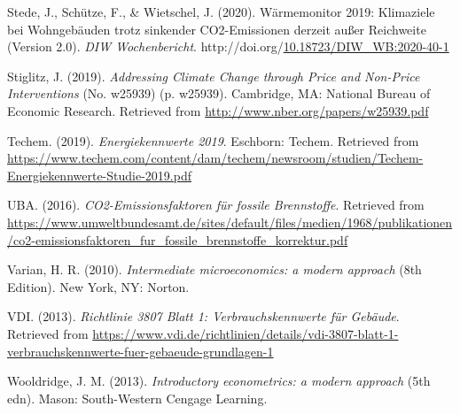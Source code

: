 \documentclass[12pt,twoside]{reedthesis}
\newlength{\cslhangindent}
\newenvironment{CSLReferences}[2] %
 {%
  \setlength{\parindent}{0pt}
  \ifodd #1 \everypar{\setlength{\hangindent}{\cslhangindent}}\ignorespaces\fi
  \ifnum #2 > 0
  \setlength{\parskip}{#2\baselineskip}
  \fi
 }%
 {}
\begin{document}
\begin{CSLReferences}{1}{0}
\leavevmode{}%
Stede, J., Schütze, F., \& Wietschel, J. (2020). Wärmemonitor 2019: Klimaziele bei Wohngebäuden trotz sinkender CO2-Emissionen derzeit außer Reichweite (Version 2.0). \emph{DIW Wochenbericht}. http://doi.org/\href{https://doi.org/10.18723/DIW_WB:2020-40-1}{10.18723/DIW\_WB:2020-40-1}

\leavevmode{}%
Stiglitz, J. (2019). \emph{Addressing Climate Change through Price and Non-Price Interventions} (No. w25939) (p. w25939). Cambridge, MA: National Bureau of Economic Research. Retrieved from \url{http://www.nber.org/papers/w25939.pdf}

\leavevmode{}%
Techem. (2019). \emph{Energiekennwerte 2019}. Eschborn: Techem. Retrieved from \url{https://www.techem.com/content/dam/techem/newsroom/studien/Techem-Energiekennwerte-Studie-2019.pdf}

\leavevmode{}%
UBA. (2016). \emph{CO2-Emissionsfaktoren für fossile Brennstoffe}. Retrieved from \url{https://www.umweltbundesamt.de/sites/default/files/medien/1968/publikationen/co2-emissionsfaktoren_fur_fossile_brennstoffe_korrektur.pdf}

\leavevmode{}%
Varian, H. R. (2010). \emph{Intermediate microeconomics: a modern approach} (8th Edition). New York, NY: Norton.

\leavevmode{}%
VDI. (2013). \emph{Richtlinie 3807 Blatt 1: Verbrauchskennwerte für Gebäude}. Retrieved from \url{https://www.vdi.de/richtlinien/details/vdi-3807-blatt-1-verbrauchskennwerte-fuer-gebaeude-grundlagen-1}

\leavevmode{}%
Wooldridge, J. M. (2013). \emph{Introductory econometrics: a modern approach} (5th edn). Mason: South-Western Cengage Learning.

\end{CSLReferences}

\end{document}
